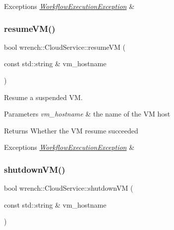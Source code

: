 \begin{DoxyExceptions}{Exceptions}
{\em \hyperlink{classwrench_1_1_workflow_execution_exception}{Workflow\+Execution\+Exception}} & \\
\hline
\end{DoxyExceptions}
\mbox{\label{classwrench_1_1_cloud_service_a7f6214c3b2b017d00812bf0a425202fc}} 
\subsubsection{\texorpdfstring{resume\+V\+M()}{resumeVM()}}
{\footnotesize\ttfamily bool wrench\+::\+Cloud\+Service\+::resume\+VM (\begin{DoxyParamCaption}\item[{const std\+::string \&}]{vm\+\_\+hostname }\end{DoxyParamCaption})\hspace{0.3cm}{\ttfamily [virtual]}}



Resume a suspended VM. 


\begin{DoxyParams}{Parameters}
{\em vm\+\_\+hostname} & the name of the VM host\\
\hline
\end{DoxyParams}
\begin{DoxyReturn}{Returns}
Whether the VM resume succeeded
\end{DoxyReturn}

\begin{DoxyExceptions}{Exceptions}
{\em \hyperlink{classwrench_1_1_workflow_execution_exception}{Workflow\+Execution\+Exception}} & \\
\hline
\end{DoxyExceptions}
\mbox{\label{classwrench_1_1_cloud_service_ac9ee0c086c699c0c690be88abc7a0f9c}} 
\subsubsection{\texorpdfstring{shutdown\+V\+M()}{shutdownVM()}}
{\footnotesize\ttfamily bool wrench\+::\+Cloud\+Service\+::shutdown\+VM (\begin{DoxyParamCaption}\item[{const std\+::string \&}]{vm\+\_\+hostname }\end{DoxyParamCaption})\hspace{0.3cm}{\ttfamily [virtual]}}



